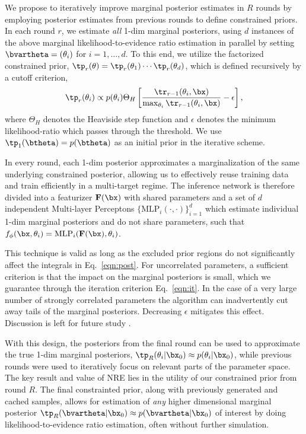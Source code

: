 We propose to iteratively improve marginal posterior estimates in $R$ rounds by employing posterior estimates from previous rounds to define constrained priors.
In each round $r$, we estimate \emph{all} 1-dim marginal posteriors, using $d$ instances of the above marginal likelihood-to-evidence ratio estimation in parallel by setting $\bvartheta = (\theta_i)$ for $i=1, \dots, d$. 
To this end, we utilize the factorized constrained prior, $\tp_r(\theta) = \tp_r(\theta_1)\cdots\tp_r(\theta_d)$, which is defined recursively by a cutoff criterion,
%
\begin{equation}
    \tp_{r}(\theta_{i}) 
    \propto 
    p(\theta_{i}) \Theta_{H} \left[ \frac{\tr_{r-1}(\theta_{i}, \bx)}{\max_{\theta_{i}} \tr_{r-1}(\theta_{i}, \bx)} - \epsilon \right],
    \label{eqn:it}
\end{equation}
%
where $\Theta_{H}$ denotes the Heaviside step function and $\epsilon$ denotes the minimum likelihood-ratio which passes through the threshold. We use $\tp_1(\btheta) = p(\btheta)$ as an initial prior in the iterative scheme.

In every round, each 1-dim posterior approximates a marginalization of the same underlying constrained posterior, allowing us to effectively reuse training data and train efficiently in a multi-target regime. The inference network is therefore divided into a featurizer $\mathbf{F}(\bx)$ with shared parameters and a set of $d$ independent Multi-layer Perceptons $\{\textrm{MLP}_i(\cdot, \cdot)\}_{i=1}^{d}$ which estimate individual 1-dim marginal posteriors and do not share parameters, such that 
$f_{\phi}(\bx, \theta_i) = \textrm{MLP}_i(\mathbf{F}(\bx), \theta_i)$.

This technique is valid as long as the excluded prior regions do not significantly affect the integrals in Eq.~\eqref{eqn:post}.  For uncorrelated parameters, a sufficient criterion is that the impact on the marginal posteriors is small, which we guarantee through the iteration criterion Eq.~\eqref{eqn:it}.  In the case of a very large number of strongly correlated parameters the algorithm can inadvertently cut away tails of the marginal posteriors. Decreasing $\epsilon$ mitigates this effect. Discussion is left for future study \cite{swyft_future}.

With this design, the posteriors from the final round can be used to approximate the true 1-dim marginal posteriors, $\tp_{R}(\theta_i \vert \bx_{0}) \approx p(\theta_i\vert \bx_{0})$, while previous rounds were used to iteratively focus on relevant parts of the parameter space. The key result and value of NRE lies in the utility of our constrained prior from round $R$. The final constrainted prior, along with previously generated and cached samples, allows for estimation of \emph{any} higher dimensional marginal posterior $\tp_R(\bvartheta|\bx_0) \approx p(\bvartheta|\bx_0)$ of interest by doing likelihood-to-evidence ratio estimation, often without further simulation. 

